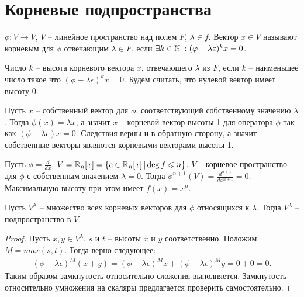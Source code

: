 \section{Корневые подпространства}

\begin{definition}
    $\phi : V \to V$, $V$ -- линейное пространство над полем $F$, $\lambda \in f$.
    Вектор $x \in V$ называют корневым для $\phi$ отвечающим $\lambda \in F$, если 
    $\exists k \in \mathbb{N} \; : (\varphi - \lambda \varepsilon)^k x = 0$.
\end{definition}

\begin{definition}
    Число $k$ -- высота корневого вектора $x$, отвечающего $\lambda$ из $F$, если $k$ -- наименьшее 
    число такое что $(\phi - \lambda \epsilon)^k x = 0$. 
    Будем считать, что нулевой вектор имеет высоту 0.
\end{definition}

\begin{example}
    Пусть $x$ -- собственный вектор для $\phi$, соответствующий собственному значению $\lambda$. 
    Тогда $\phi(x) = \lambda x$, а значит $x$ -- корневой вектор высоты 1 для оператора $\phi$ 
    так как $(\phi - \lambda \epsilon) x = 0$.
    Следствия верны и в обратную сторону, а значит собственные векторы являются корневыми векторами 
    высоты 1.
\end{example}

\begin{example}
    Пусть $\phi = \frac{d}{dx}$, $V = \mathbb{R}_n[x] = \{ c \in \mathbb{R}_n[x] \, \vert \deg f \leqslant n\}$. $V$ -- 
    корневое пространство для $\phi$ с собственным значением $\lambda = 0$. 
    Тогда $\phi^{n+1}(V) = \frac{d^{n+1}}{dx^{n+1}} = 0$. 
    Максимальную высоту при этом имеет $f(x) = x^n$. 
\end{example}


\begin{proposition}
    Пусть $V^{\lambda}$ -- множество всех корневых векторов для $\phi$ относящихся к $\lambda$.
    Тогда $V^{\lambda}$ -- подпространство в $V$.
\end{proposition}

\begin{proof}
    Пусть $x, y \in V^{\lambda}$, $s$ и $t$ -- высоты $x$ и $y$ соответственно. 
    Положим $M = max(s, t)$. Тогда верно следующее:
    \begin{eqnarray}
        (\phi - \lambda \epsilon)^M(x+y) = (\phi - \lambda \epsilon)^M x + 
        (\phi - \lambda \epsilon)^M y = 0 + 0 = 0.
    \end{eqnarray}
    Таким образом замкнутость относительно сложения выполняется. Замкнутость относительно умножения 
    на скаляры предлагается проверить самостоятельно.
\end{proof}

